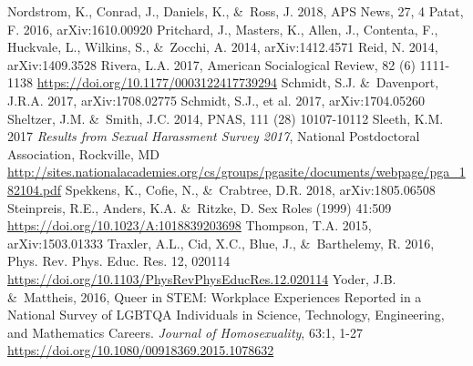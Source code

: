 \documentclass[modern]{aastex62}
\begin{document}
\begin{thebibliography}{}
 Nordstrom, K., Conrad, J., Daniels, K., \&\ Ross, J. 2018, APS News, 27, 4
 Patat, F. 2016, arXiv:1610.00920
 Pritchard, J., Masters, K., Allen, J., Contenta, F., Huckvale, L., Wilkins, S., \&\ Zocchi, A. 2014, arXiv:1412.4571
 Reid, N. 2014, arXiv:1409.3528
 Rivera, L.A. 2017, American Socialogical Review, 82 (6) 1111-1138 \url{https://doi.org/10.1177/0003122417739294}
 Schmidt, S.J. \&\ Davenport, J.R.A. 2017, arXiv:1708.02775
 Schmidt, S.J., et al. 2017, arXiv:1704.05260
 Sheltzer, J.M. \&\ Smith, J.C. 2014, PNAS, 111 (28) 10107-10112
 Sleeth, K.M. 2017 {\it Results from Sexual Harassment Survey 2017}, National Postdoctoral Association, Rockville, MD \url{http://sites.nationalacademies.org/cs/groups/pgasite/documents/webpage/pga_182104.pdf}
 Spekkens, K., Cofie, N., \&\ Crabtree, D.R. 2018, arXiv:1805.06508
 Steinpreis, R.E., Anders, K.A. \&\ Ritzke, D. Sex Roles (1999) 41:509 \url{https://doi.org/10.1023/A:1018839203698}
 Thompson, T.A. 2015, arXiv:1503.01333
 Traxler, A.L., Cid, X.C., Blue, J., \&\ Barthelemy, R. 2016, Phys. Rev. Phys. Educ. Res. 12, 020114 \url{https://doi.org/10.1103/PhysRevPhysEducRes.12.020114}
 Yoder, J.B. \&\ Mattheis, 2016, Queer in STEM: Workplace Experiences Reported in a National Survey of LGBTQA Individuals in Science, Technology, Engineering, and Mathematics Careers. {\it Journal of Homosexuality}, 63:1, 1-27 \url{https://doi.org/10.1080/00918369.2015.1078632}
\end{thebibliography}
\end{document}
